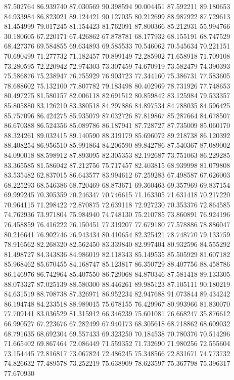 87.502764
86.939740
87.030569
90.398594
90.004451
87.592211
89.180653
84.933984
86.823021
89.124421
90.127035
80.212699
88.987922
87.729613
81.454999
79.017245
81.154423
81.762091
87.800366
85.212931
55.994766
30.180605
67.220171
67.426862
67.878781
68.177932
68.155191
68.747529
68.427376
69.584855
69.634893
69.585533
70.546062
70.545634
70.221151
70.690499
71.277732
71.182457
70.899149
72.285902
71.658918
71.709108
73.280595
72.220942
72.974303
73.307459
74.670919
73.582479
74.390393
75.586876
75.238947
76.755929
76.903723
77.344160
75.386731
77.583605
78.688602
75.132100
77.807782
79.183498
80.402969
78.731926
77.748653
80.497275
81.580157
82.006118
82.691512
80.859842
83.125984
79.533357
85.805880
83.126210
83.380518
84.297886
84.897534
84.788035
84.596425
85.757096
86.424275
85.935079
87.032726
87.819867
85.287664
84.678507
86.670388
86.524356
85.089786
86.187941
87.728727
87.735009
85.060170
88.324261
89.032415
89.140590
88.319179
85.696072
89.218738
86.120392
88.408254
86.956510
85.991864
84.206590
89.842786
87.540367
87.089002
84.090018
88.598912
87.893095
82.305353
82.192687
73.751063
86.229285
83.365585
81.586042
87.212756
75.717457
82.403815
68.939998
81.079808
83.535482
62.837015
86.643577
83.994612
67.259283
67.498587
67.626003
68.225293
68.546386
68.720469
68.873671
69.360463
69.357969
69.837154
69.999245
70.305359
70.246347
70.746615
71.163305
71.631418
70.217220
70.964115
71.298422
72.870875
72.639118
72.927230
70.353376
72.864585
74.762936
73.971804
75.984940
74.748130
75.210785
73.860891
76.924196
76.458859
76.416222
76.150451
77.319207
77.679180
77.578886
78.886047
80.216641
76.902746
76.943434
80.410654
82.325421
78.748770
79.133759
78.916562
82.268320
82.562450
83.339840
82.997404
80.932596
84.555292
81.498727
84.343836
84.986019
82.118343
85.149535
85.505929
81.607182
85.968462
85.670455
84.168747
85.123817
86.350729
88.407756
88.458786
86.146976
86.742964
85.407550
86.729068
84.870346
87.581418
89.133305
88.073327
87.025139
88.580300
88.446261
89.985123
87.105111
90.180219
84.631519
88.708738
87.326971
86.952234
82.947688
91.073844
89.434242
86.194748
84.233518
88.989015
75.678155
76.429967
80.993966
81.830070
77.709141
83.036529
81.315912
66.346239
75.601081
76.668247
35.876612
66.990527
67.223676
67.282499
67.940173
68.305618
68.718862
68.609032
68.791635
68.692304
69.557433
69.323250
70.184538
70.780376
70.514296
71.665402
69.867464
72.086449
71.559352
71.732690
71.980256
72.555604
73.154445
72.816817
73.067824
72.486245
75.348566
72.831671
74.773732
74.826632
77.489578
73.252219
75.638909
78.623597
75.367798
75.396317
77.670930
